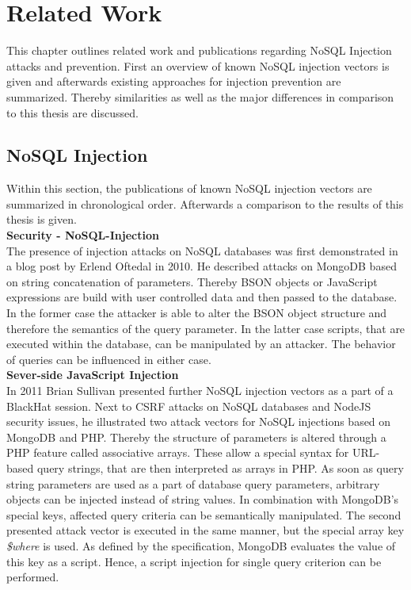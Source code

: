 \chapter{Related Work}
This chapter outlines related work and publications regarding NoSQL Injection attacks and prevention. First an overview of known NoSQL injection vectors is given and afterwards existing approaches for injection prevention are summarized. Thereby similarities as well as the major differences in comparison to this thesis are discussed.

\section{NoSQL Injection}
Within this section, the publications of known NoSQL injection vectors are summarized in chronological order. Afterwards a comparison to the results of this thesis is given. \\

\textbf{Security - NoSQL-Injection}\cite{Oftedal:2010} \\
The presence of injection attacks on NoSQL databases was first demonstrated in a blog post by Erlend Oftedal in 2010. He described attacks on MongoDB based on string concatenation of parameters. Thereby BSON objects or JavaScript expressions are build with user controlled data and then passed to the database. In the former case the attacker is able to alter the BSON object structure and therefore the semantics of the query parameter. In the latter case scripts, that are executed within the database, can be manipulated by an attacker. The behavior of queries can be influenced in either case. \\

\textbf{Sever-side JavaScript Injection}\cite{Sullivan:2011} \\
In 2011 Brian Sullivan presented further NoSQL injection vectors as a part of a BlackHat session. Next to CSRF attacks on NoSQL databases and NodeJS security issues, he illustrated two attack vectors for NoSQL injections based on MongoDB and PHP. Thereby the structure of parameters is altered through a PHP feature called associative arrays. These allow a special syntax for URL-based query strings, that are then interpreted as arrays in PHP. As soon as query string parameters are used as a part of database query parameters, arbitrary objects can be injected instead of string values. In combination with MongoDB's special keys, affected query criteria can be semantically manipulated. The second presented attack vector is executed in the same manner, but the special array key \textit{\$where} is used. As defined by the specification, MongoDB evaluates the value of this key as a script. Hence, a script injection for single query criterion can be performed. \\

